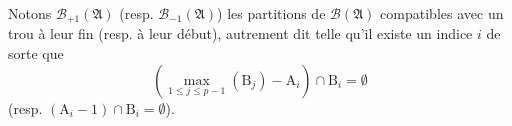 \documentclass[11pt, oneside]{article}   	%
\begin{document}
Notons $\mathcal{B}_{+1}(\mathfrak{A})$ (resp. $\mathcal{B}_{-1}(\mathfrak{A})$) les partitions de $\mathcal{B}(\mathfrak{A})$ compatibles
avec un trou à leur fin (resp. à leur début), autrement dit telle qu'il existe un indice $i$ de sorte que
\begin{equation}
 \left( \max_{1 \leqslant j \leqslant p-1}(\mathrm{B}_j) - \mathrm{A}_i \right) \cap \mathrm{B}_i = \emptyset
\end{equation}
(resp. $(\mathrm{A}_i - 1) \cap \mathrm{B}_i = \emptyset$).
\end{document}
